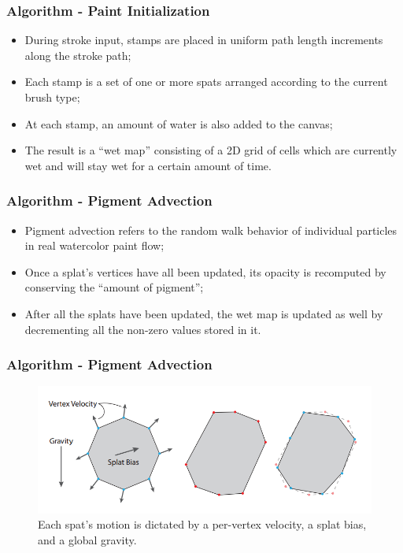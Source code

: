 \documentclass{beamer}
\begin{document}
\begin{frame}
    \frametitle{Algorithm - Paint Initialization}
    \begin{itemize}
        \item During stroke input, stamps are placed in uniform path length
        increments along the stroke path;
        \item Each stamp is a set of one or more spats arranged according to
        the current brush type;
        \item At each stamp, an amount of water is also added to the canvas;
        \item The result is a ``wet map'' consisting of a 2D grid of cells
        which are currently wet and will stay wet for a certain amount of time.
    \end{itemize}
\end{frame}

\begin{frame}
    \frametitle{Algorithm - Pigment Advection}
    \begin{itemize}
        \item Pigment advection refers to the random walk behavior of
        individual particles in real watercolor paint flow;
        \item Once a splat's vertices have all been updated, its opacity
        is recomputed by conserving the ``amount of pigment'';
        \item After all the splats have been updated, the wet map is updated
        as well by decrementing all the non-zero values stored in it.
    \end{itemize}
\end{frame}

\begin{frame}
    \frametitle{Algorithm - Pigment Advection}
    \begin{figure}
        \centering
        \includegraphics[width=0.8\paperwidth]{f3.png}
        \caption{\footnotesize{Each spat's motion is dictated by a per-vertex
        velocity, a splat bias, and a global gravity.}}
    \end{figure}
\end{frame}
\end{document}
